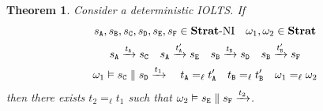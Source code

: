 \documentclass[preprint,5p,twocolumn]{elsarticle}
\newtheorem{theorem}{Theorem}
\begin{document}
\begin{theorem}
  \label{thm:helper deterministic}
  Consider a deterministic IOLTS. If
  \begin{gather*}
    s_{\mathtt{A}}, s_{\mathtt{B}}, s_{\mathtt{C}}, s_{\mathtt{D}}, s_{\mathtt{E}}, s_{\mathtt{F}} \in \mathbf{Strat}\text{-}\mathrm{NI}\quad
    \omega_1,\omega_2 \in \mathbf{Strat}\\
    s_{\mathtt{A}} \xrightarrow{t_{\mathtt{A}}} s_{\mathtt{C}} \quad s_{\mathtt{A}} \xrightarrow{t'_{\mathtt{A}}} s_{\mathtt{E}}\quad
    s_{\mathtt{B}} \xrightarrow{t_{\mathtt{B}}} s_{\mathtt{D}} \quad s_{\mathtt{B}} \xrightarrow{t'_{\mathtt{B}}} s_{\mathtt{F}}\\
    \omega_1 \vDash s_{\mathtt{C}} \parallel s_{\mathtt{D}} \xrightarrow{t_1} \quad
    t_{\mathtt{A}} =_\ell t'_{\mathtt{A}} \quad t_{\mathtt{B}} =_\ell t'_{\mathtt{B}}\quad
    \omega_1 =_\ell \omega_2
  \end{gather*}
  then there exists $t_2 =_\ell t_1$ such that $\omega_2 \vDash s_{\mathtt{E}} \parallel s_{\mathtt{F}} \xrightarrow{t_2}$.
\end{theorem}
\end{document}

